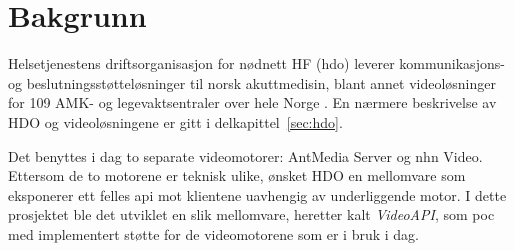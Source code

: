 


\section{Bakgrunn}
\label{sec:bakgrunn}
Helsetjenestens driftsorganisasjon for nødnett HF (\gls{hdo}) leverer kommunikasjons- og beslutningsstøtteløsninger til norsk akuttmedisin, blant annet videoløsninger for 109 AMK- og legevaktsentraler over hele Norge \cite{hdo_kravspec}. En nærmere beskrivelse av HDO og videoløsningene er gitt i delkapittel~\ref{sec:hdo}.

Det benyttes i dag to separate videomotorer: AntMedia Server og \gls{nhn} Video. Ettersom de to motorene er teknisk ulike, ønsket HDO en mellomvare som eksponerer ett felles \gls{api} mot klientene uavhengig av underliggende motor. I dette prosjektet ble det utviklet en slik mellomvare, heretter kalt \textit{VideoAPI}, som \gls{poc} med implementert støtte for de videomotorene som er i bruk i dag.